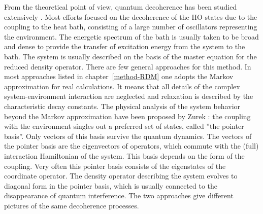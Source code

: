 \documentclass[12pt,twoside,a4paper]{report}
\begin{document}
From the theoretical point of view, quantum decoherence has been
studied extensively \cite{2,9,10,11,12,13,14,15,16}.  Most efforts
focused on the decoherence of the HO states due to
the coupling to the heat bath, consisting of a large number of
oscillators representing the environment.  The energetic spectrum of the
bath is usually taken to be broad and dense to provide the transfer of
excitation energy from the system to the bath.  The system is usually described on
the basis of the master equation for the reduced density operator. 
There are few general approaches  for this method. 
In most  approaches listed in chapter~\ref{method-RDM}
one adopts the Markov
approximation for real calculations. 
It means that all details of the complex system-environment
interaction are neglected and relaxation is described by
the characteristic decay constants. 
The physical analysis of the 
system behavior beyond the Markov approximation have been proposed by
Zurek \cite{2}: the coupling with the environment singles out a
preferred set of states, called ''the pointer basis''. Only vectors of
this basis survive the quantum dynamics.  The vectors of the pointer
basis are the eigenvectors of operators, which commute with the (full)
interaction Hamiltonian of the system. This basis depends on the form
of the coupling. Very often this pointer basis consists of the
eigenstates of the coordinate operator. The density operator
describing the system evolves to diagonal form in the pointer basis,
which is usually connected to the disappearance of quantum
interference. The two approaches give different pictures of the same
decoherence processes.
\end{document}
